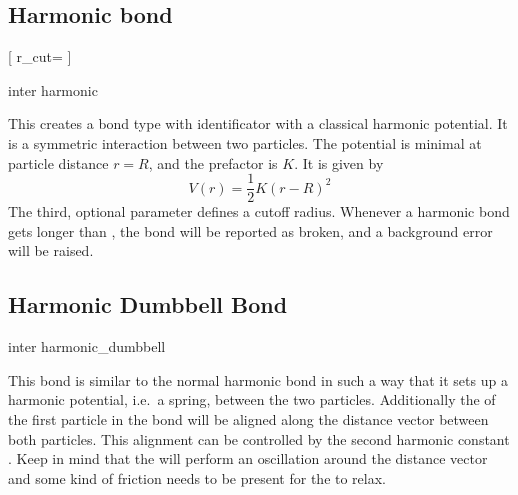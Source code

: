\subsection{Harmonic bond}

\PythonSyntaxOn
\begin{pysyntax}
  [
    r_cut=
  ]
\end{pysyntax}
\PythonSyntaxOff

\begin{essyntax}
  inter 
  harmonic   
\end{essyntax}
This creates a bond type with identificator  with a
classical harmonic potential. It is a symmetric interaction between two
particles. The potential is minimal at particle distance $r=R$, and the
prefactor is $K$. It is given by
\begin{equation}
  V(r) = \frac{1}{2} K \left( r - R \right)^2
\end{equation}
The third, optional parameter  defines a cutoff
radius.  Whenever a harmonic bond gets longer than
, the bond will be reported as broken, and a
background error will be raised.

\subsection{Harmonic Dumbbell Bond}

\begin{essyntax}
  inter 
  harmonic_dumbbell    
  \begin{features}
  \end{features}
\end{essyntax}
This bond is similar to the normal harmonic bond in such a way that it
sets up a harmonic potential, i.e.\ a spring, between the two
particles.  Additionally the  of the first particle in
the bond will be aligned along the distance vector between both
particles.  This alignment can be controlled by the second harmonic
constant .  Keep in mind that the  will perform
an oscillation around the distance vector and some kind of friction
needs to be present for the  to relax.

